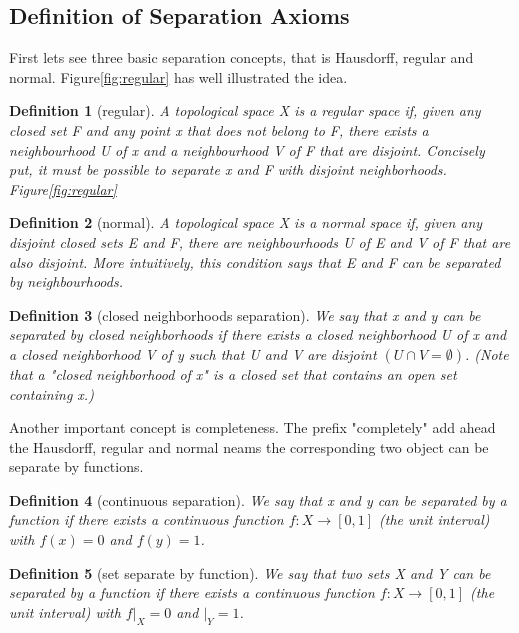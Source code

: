 \documentclass{article}
\newtheorem{definition}{Definition}[section]    %
\begin{document}
\subsection{Definition of Separation Axioms}
First lets see three basic separation concepts,
that is Hausdorff, regular and normal.
Figure\ref{fig:regular} has well illustrated the
idea.
\begin{definition}[regular]
    A topological space X is a regular space if,
    given any closed set F and any point x that
    does not belong to F, there exists a neighbourhood
    U of x and a neighbourhood V of F
    that are disjoint. Concisely put,
    it must be possible to separate x and F
    with disjoint neighborhoods.
    \cite[Reglarspace]{Reglarspace}
    Figure\ref{fig:regular}
\end{definition}
\begin{definition}[normal]
    A topological space X is a normal space if, given
    any disjoint closed sets E and F, there are
    neighbourhoods U of E and V of F that are also
    disjoint. More intuitively, this condition says
    that E and F can be separated by neighbourhoods.
    \cite[Normal]{Normal}
\end{definition}
\begin{definition}[closed neighborhoods separation]
    We say that x and y can be separated by closed
    neighborhoods if there exists a closed neighborhood
    U of x and a closed neighborhood V of y such that U
    and V are disjoint $(U \cap V = \emptyset)$.
    (Note that a "closed neighborhood of x" is
    a closed set that contains an open set
    containing x.)
    \cite[UandcHs]{UandcHs}
\end{definition}
Another important concept is completeness.
The prefix "completely" add ahead the
Hausdorff, regular and normal neams the
corresponding two object can be separate
by functions.
\begin{definition}[continuous separation]
    We say that x and y can be separated by a function
    if there exists a continuous function
    $f:X \to [0,1]$ (the unit interval) with
    $f(x) = 0$ and $f(y) = 1$.
    \cite[UandcHs]{UandcHs}
\end{definition}
\begin{definition}[set separate by function]
    We say that two sets X and Y can
    be separated by a function
    if there exists a continuous function
    $f:X \to [0,1]$ (the unit interval) with
    $f\vert _{X} = 0$ and $\vert _{Y} = 1$.
    \cite[UandcHs]{UandcHs}
\end{definition}
\end{document}
